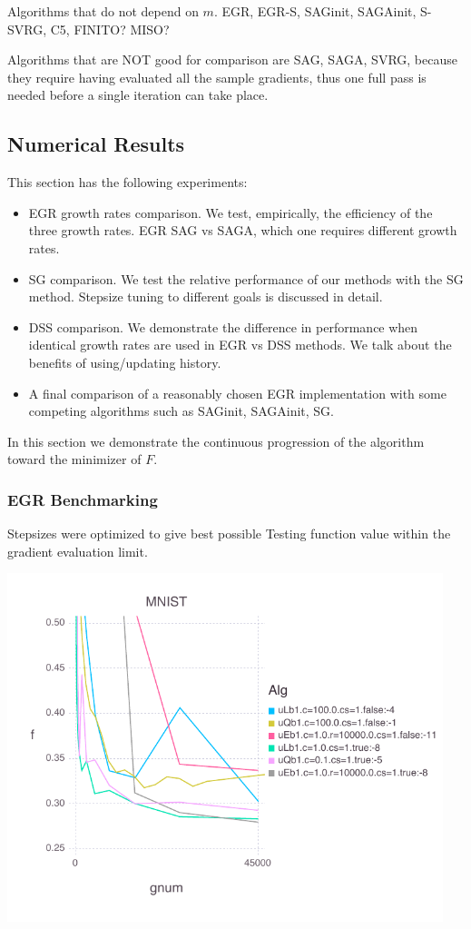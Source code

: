 \documentclass[11pt]{article}
\begin{document}
   Algorithms that do not depend on $m$. EGR, EGR-S, SAGinit, SAGAinit, S-SVRG, C5, FINITO? MISO?
   
   Algorithms that are NOT good for comparison are SAG, SAGA, SVRG, because they require having evaluated all the sample gradients, thus one full pass is needed before a single iteration can take place. 
   
   \subsection{Numerical Results}

   This section has the following experiments: 
   \begin{itemize}
    \item EGR growth rates comparison. We test, empirically, the efficiency of the three growth rates. EGR SAG vs SAGA, which one requires different growth rates. 
    \item SG comparison. We test the relative performance of our methods with the SG method. Stepsize tuning to different goals is discussed in detail. 
   	\item DSS comparison. We demonstrate the difference in performance when identical growth rates are used in EGR vs DSS methods. We talk about the benefits of using/updating history. 
   	\item A final comparison of a reasonably chosen EGR implementation with some competing algorithms such as SAGinit, SAGAinit, SG.
   \end{itemize}

   In this section we demonstrate the continuous progression of the algorithm toward the minimizer of $F$.
   
   \newpage 
   
   \subsubsection{EGR Benchmarking}
   
   Stepsizes were optimized to give best possible Testing function value within the gradient evaluation limit.
   
   \includegraphics[width= 5in]{Figures/MNISTBLtruefInitialHeuristics.pdf}
   
\end{document}

